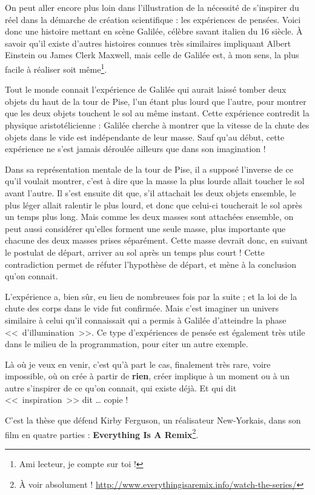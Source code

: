 On peut aller encore plus loin dans l'illustration de la nécessité de s'inspirer du réel dans la démarche de création scientifique : les expériences de pensées.
Voici donc une histoire mettant en scène Galilée, célèbre savant italien du 16\ieme{} siècle.
À savoir qu'il existe d'autres histoires connues très similaires impliquant Albert Einstein ou James Clerk Maxwell, mais celle de Galilée est, à mon sens, la plus facile à réaliser soit même\footnote{Ami lecteur, je compte sur toi !}.

Tout le monde connait l'expérience de Galilée qui aurait laissé tomber deux objets du haut de la tour de Pise, l'un étant plus lourd que l'autre, pour montrer que les deux objets touchent le sol au même instant.
Cette expérience contredit la physique aristotélicienne : Galilée cherche à montrer que la vitesse de la chute des objets dans le vide est indépendante de leur masse.
Sauf qu'au début, cette expérience ne s'est jamais déroulée ailleurs que dans son imagination !

Dans sa représentation mentale de la tour de Pise, il a supposé l'inverse de ce qu'il voulait montrer, c'est à dire que la masse la plus lourde allait toucher le sol avant l'autre.
Il s'est ensuite dit que, s'il attachait les deux objets ensemble, le plus léger allait ralentir le plus lourd, et donc que celui-ci toucherait le sol après un temps plus long.
Mais comme les deux masses sont attachées ensemble, on peut aussi considérer qu'elles forment une seule masse, plus importante que chacune des deux masses prises séparément.
Cette masse devrait donc, en suivant le postulat de départ, arriver au sol après un temps plus court !
Cette contradiction permet de réfuter l'hypothèse de départ, et mène à la conclusion qu'on connait.

L'expérience a, bien sûr, eu lieu de nombreuses fois par la suite ; et la loi de la chute des corps dans le vide fut confirmée.
Mais c'est imaginer un univers similaire à celui qu'il connaissait qui a permis à Galilée d'atteindre la phase <<~d'illumination~>>.
Ce type d'expériences de pensée est également très utile dans le milieu de la programmation, pour citer un autre exemple.

Là où je veux en venir, c'est qu'à part le cas, finalement très rare, voire impossible, où on crée à partir de \textbf{rien}, créer implique à un moment ou à un autre s'inspirer de ce qu'on connait, qui existe déjà.
Et qui dit <<~inspiration~>> dit \dots{} copie !

C'est la thèse que défend Kirby Ferguson, un réalisateur New-Yorkais, dans son film en quatre parties : \textbf{Everything Is A Remix}\footnote{À voir absolument ! \url{http://www.everythingisaremix.info/watch-the-series/}}.


